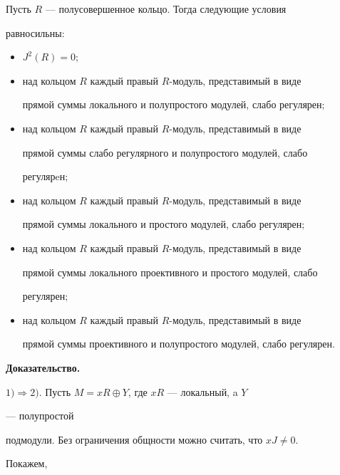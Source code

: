 \begin{thm} 


Пусть $R$ --- полусовершенное кольцо. Тогда следующие условия 


равносильны\/${:}$


\begin{itemize} 


\item[1)] $J^2(R)=0;$ 


\item[2)] над кольцом $R$ каждый правый $R$-модуль, представимый в виде 


прямой суммы локального и полупростого модулей, слабо регулярен\/$;$ 


\item[3)] над кольцом $R$ каждый правый $R$-модуль, представимый в виде 


прямой суммы слабо регулярного и полупростого модулей, слабо 


регулярeн\/$;$ 


\item[4)] над кольцом $R$ каждый правый $R$-модуль, представимый в виде 


прямой суммы локального и простого модулей, слабо регулярен\/$;$ 


\item[5)] над кольцом $R$ каждый правый $R$-модуль, представимый в виде 


прямой суммы локального проективного и простого модулей, слабо 


регулярен\/$;$ 


\item[6)] над кольцом $R$ каждый правый $R$-модуль, представимый в виде 


прямой суммы проективного и полупростого модулей, слабо регулярен. 


\end{itemize} 


\end{thm} 


 


 


{\bf Доказательство.} 


$1)\Rightarrow 2)$. Пусть $M=xR\oplus Y$, где $xR$ --- локальный, a $Y$ 


--- полупростой 


подмодули. Без ограничения общности можно считать, что $xJ\ne0$. 


Покажем, 


